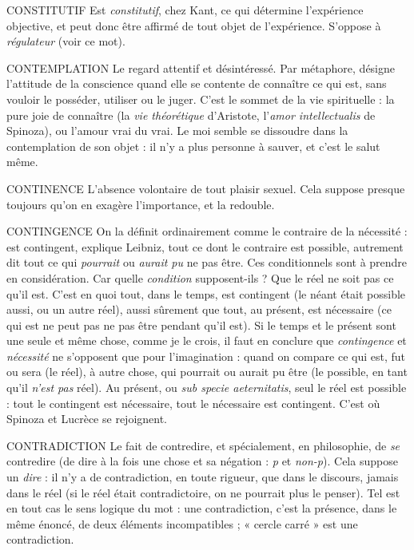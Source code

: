 CONSTITUTIF Est {\it constitutif}, chez Kant, ce qui détermine l’expérience
objective, et peut donc être affirmé de tout objet de l’expérience.
S’oppose à {\it régulateur} (voir ce mot).

CONTEMPLATION Le regard attentif et désintéressé. Par métaphore, désigne
l'attitude de la conscience quand elle se contente de
connaître ce qui est, sans vouloir le posséder, utiliser ou le juger. C’est le
sommet de la vie spirituelle : la pure joie de connaître (la {\it vie théorétique} d’Aristote,
l’{\it amor intellectualis} de Spinoza), ou l'amour vrai du vrai. Le moi semble se
dissoudre dans la contemplation de son objet : il n’y a plus personne à sauver,
et c’est le salut même.

CONTINENCE L'absence volontaire de tout plaisir sexuel. Cela suppose
presque toujours qu'on en exagère l'importance, et la
redouble.

CONTINGENCE On la définit ordinairement comme le contraire de la nécessité :
est contingent, explique Leibniz, tout ce dont le
contraire est possible, autrement dit tout ce qui {\it pourrait} ou {\it aurait pu} ne pas
être. Ces conditionnels sont à prendre en considération. Car quelle {\it condition} supposent-ils ?
Que le réel ne soit pas ce qu’il est. C’est en quoi tout, dans le temps,
est contingent (le néant était possible aussi, ou un autre réel), aussi sûrement que
tout, au présent, est nécessaire (ce qui est ne peut pas ne pas être pendant qu’il
est). Si le temps et le présent sont une seule et même chose, comme je le crois, il
faut en conclure que {\it contingence} et {\it nécessité} ne s'opposent que pour l’imagination :
quand on compare ce qui est, fut ou sera (le réel), à autre chose, qui
pourrait ou aurait pu être (le possible, en tant qu’il {\it n'est pas} réel). Au présent, ou
{\it sub specie aeternitatis}, seul le réel est possible : tout le contingent est nécessaire,
tout le nécessaire est contingent. C’est où Spinoza et Lucrèce se rejoignent.

CONTRADICTION Le fait de contredire, et spécialement, en philosophie,
de {\it se} contredire (de dire à la fois une chose et sa
négation : {\it p} et {\it non-p}). Cela suppose un {\it dire} : il n’y a de contradiction, en toute
rigueur, que dans le discours, jamais dans le réel (si le réel était contradictoire,
on ne pourrait plus le penser). Tel est en tout cas le sens logique du mot : une
contradiction, c’est la présence, dans le même énoncé, de deux éléments
incompatibles ; « cercle carré » est une contradiction.

